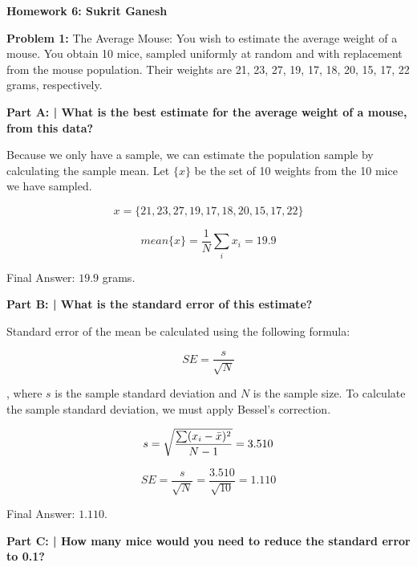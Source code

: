 \documentclass{article}
\begin{document}
 
 \begin{center}
     \Huge\textbf{Homework 6: Sukrit Ganesh}\par
 \end{center}
 
  \noindent\makebox[\linewidth]{\rule{\paperwidth}{0.4pt}}\newline
 
 \begin{center}
      \Large\textbf{Problem 1:} The Average Mouse: You wish to estimate the average weight of a mouse. You obtain 10 mice, sampled uniformly at random and with replacement from the mouse population. Their weights are 21, 23, 27, 19, 17, 18, 20, 15, 17, 22 grams, respectively. \par
 \end{center}
 
 \textbf{Part A: | What is the best estimate for the average weight of a mouse, from this data?}\newline
 
 Because we only have a sample, we can estimate the population sample by calculating the sample mean. Let $\{x\}$ be the set of 10 weights from the 10 mice we have sampled.\newline
 
 \[x = \{21,23,27,19,17,18,20,15,17,22\}\]
 
 \[mean\{x\} = \frac{1}{N}\sum_{i}^{}x_i = 19.9\]
 
 Final Answer: $19.9$ grams.\newline
 
 \textbf{Part B: | What is the standard error of this estimate?}\newline
 
 Standard error of the mean be calculated using the following formula:
 
 \[SE=\frac{s}{\sqrt{N}}\]
 
 , where $s$ is the sample standard deviation and $N$ is the sample size. To calculate the sample standard deviation, we must apply Bessel's correction.
 
 \[s = \sqrt{\frac{\sum(x_i-\Bar{x})^2}{N-1}} = 3.510\]
 
 \[SE = \frac{s}{\sqrt{N}} = \frac{3.510}{\sqrt{10}} = 1.110\]
 
 Final Answer: $1.110$.\newline
 
 \textbf{Part C: | How many mice would you need to reduce the standard error to 0.1?}\newline
 
\end{document}
